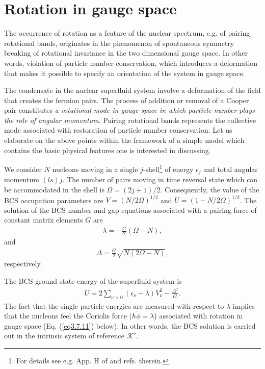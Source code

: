 \section{Rotation in gauge space}\label{S3.7}
The occurrence of rotation as a feature of the nuclear spectrum, e.g. of pairing rotational bands, originates in the phenomenon of spontaneous symmetry breaking of rotational invariance in the two dimensional gauge space. In other words, violation of particle number conservation, which introduces a deformation that makes it possible to specify an orientation of the system in gauge space.


The condensate in the nuclear superfluid system involve a deformation of the field that creates the fermion pairs. The process of addition or removal of a Cooper pair constitutes \textit{a rotational mode in gauge space in which particle number plays the role of angular momentum}. Pairing rotational bands represents the collective mode associated with restoration of particle number conservation.
Let us elaborate on the above points within the framework of a simple model which contains the basic physical features one is interested in discussing.


We consider $N$ nucleons moving in a single $j$-shell\footnote{For details see e.g. App. H of \cite{Brink:05} and refs. therein.} of energy $\epsilon_j$ and total angular momentum $(ls)j$. The number of pairs moving in time reversal state which can be accommodated in the shell is $\Omega=(2j+1)/2$. Consequently, the value of the BCS occupation parameters are $V=(N/2\Omega)^{1/2}$ and $U=(1-N/2\Omega)^{1/2}$. The solution of the BCS number and gap equations associated with a pairing force of constant matrix elements $G$ are
  \begin{align}\label{eq3.7.1}
  \lambda=-\frac{G}{2}(\Omega-N),
  \end{align}
  and
  \begin{align}\label{eq3.7.2}
\Delta=\frac{G}{2}\sqrt{N(2\Omega-N)},
  \end{align}
respectively.


The BCS ground state energy of the superfluid system is
  \begin{align}\label{eq3.7.3}
U=2\sum_{\nu>0}(\epsilon_\nu-\lambda)V^2_\nu-\frac{\Delta^2}{G}.
  \end{align}
  The fact that the single-particle energies are measured with respect to $\lambda$ implies that the nucleons feel the Coriolis force ($\hbar\dot{\phi}=\lambda$) associated with rotation in gauge space (Eq. (\ref{eq3.7.11}) below). In other words, the BCS solution is carried out in the intrinsic system of reference $\mathcal K'$.
  
